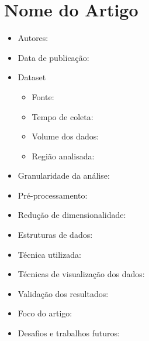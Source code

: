 \documentclass[paper=a4, fontsize=11pt]{scrartcl}
\begin{document}
\newpage

\section*{\textcolor{VioletRed4}{Nome do Artigo}}

\begin{itemize}
	\item Autores:
	\item Data de publicação:
	\item Dataset
	\begin{itemize}
		\item Fonte:
		\item Tempo de coleta:
		\item Volume dos dados:
		\item Região analisada:
	\end{itemize}
	\item Granularidade da análise:
	\item Pré-processamento:
	\item Redução de dimensionalidade:
	\item Estruturas de dados:
	\item Técnica utilizada:
	\item Técnicas de visualização dos dados:
	\item Validação dos resultados:
	\item Foco do artigo:
	\item Desafios e trabalhos futuros:
\end{itemize}

\newpage




\end{document}
